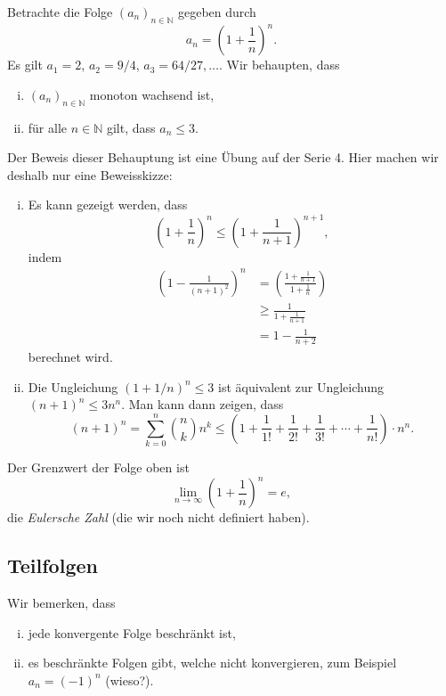 \documentclass[../main.tex]{subfiles}
\begin{document}
\begin{example}
  Betrachte die Folge ${(a_n)}_{n \in \mathbb{N}}$ 
  gegeben durch
   \[
   a_n = {\left( 1 + \frac{1}{n} \right)}^n.
   \]
   Es gilt $a_1 = 2$, $a_2 = 9/4$, $a_3 = 64/27, \dots$.
   Wir behaupten, dass
   \begin{enumerate}[(i)]
     \item ${(a_n)}_{n \in \mathbb{N}}$ monoton wachsend ist,
     \item für alle $n \in \mathbb{N}$ gilt, dass
       $a_n \leq 3$.
   \end{enumerate}
   Der Beweis dieser Behauptung ist eine Übung auf
   der Serie 4. Hier machen wir deshalb nur eine Beweisskizze:
   \begin{enumerate}[(i)]
     \item Es kann gezeigt werden, dass
       \[
         {\left( 1 + \frac{1}{n} \right) }^n \leq
         {\left( 1 + \frac{1}{n+1} \right)}^{n+1},
       \]
       indem 
       \begin{align*}
         {\left( 1 - \frac{1}{{(n+1)}^2} \right)}^n &=
         {\left( \frac{1 + \frac{1}{n+1}}{1 + \frac{1}{n}} \right) } \\& 
         \geq \frac{1}{1 + \frac{1}{n+1}}\\
                       &= 1 - \frac{1}{n+2}
       \end{align*}
       berechnet wird.
     \item
       Die Ungleichung ${(1 + 1/n)}^n \leq 3$ ist äquivalent
       zur Ungleichung ${(n + 1)}^n \leq 3n^n$.
       Man kann dann zeigen, dass
       \[
         {(n+1)}^n =
         \sum_{k=0}^{n} \binom{n}{k}n^k 
         \leq \left( 1 + \frac{1}{1!}
         + \frac{1}{2!} + \frac{1}{3!} + \cdots +
       \frac{1}{n!}\right) \cdot n^n.
       \]
   \end{enumerate}
\end{example}

\begin{remark}
  Der Grenzwert der Folge oben ist
  \[
    \lim_{n \to \infty} {\left( 1 + \frac{1}{n} \right)}^n = e,
  \]
  die \emph{Eulersche Zahl} (die wir noch nicht definiert haben).
\end{remark}

\subsection*{Teilfolgen}
Wir bemerken, dass
\begin{enumerate}[(i)]
  \item jede konvergente Folge beschränkt ist,
  \item es beschränkte Folgen gibt, welche nicht konvergieren,
    zum Beispiel $a_n = {(-1)}^n$ (wieso?).
\end{enumerate}
\end{document}
